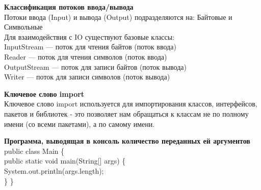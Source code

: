 \documentclass{article}
\begin{document}
\begin{minipage}{.3\textwidth}
    \textbf{Классификация потоков ввода/вывода}\\
    Потоки ввода (Input) и вывода (Output) подразделяются на: Байтовые и Символьные\\
    Для взаимодействия с IO существуют базовые классы:\\
    InputStream — поток для чтения байтов (поток ввода)\\
Reader — поток для чтения символов (поток ввода)\\
OutputStream — поток для записи байтов (поток вывода)\\
Writer — поток для записи символов (поток вывода)
    
\end{minipage}
\hfill
\begin{minipage}{.3\textwidth}
    \textbf{Ключевое слово import}\\
    Ключевое слово import используется для импортирования классов, интерфейсов, пакетов и библиотек - 
    это позволяет нам обращаться к классам не по полному имени (со всеми пакетами), 
    а по самому имени.
\end{minipage}
\hfill
\begin{minipage}{.3\textwidth}
    \textbf{Программа, выводящая в консоль количество переданных ей аргументов}\\
    public class Main \{\\
    public static void main(String[] args) \{\\
        System.out.println(args.length);\\
    \}
\}

\end{minipage}
\\ \\
\end{document}
